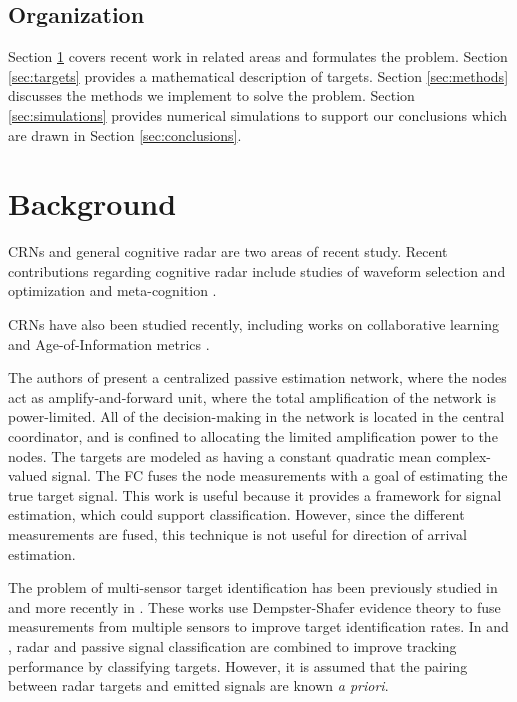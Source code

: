 \documentclass[journal,12pt,onecolumn,draftclsnofoot,]{IEEEtran}
\theoremstyle{definition}
\begin{document}
\subsection{Organization} 
Section \ref{sec:background} covers recent work in related areas and formulates the problem. 
Section \ref{sec:targets} provides a mathematical description of targets. 
Section \ref{sec:methods} discusses the methods we implement to solve the problem. 
Section \ref{sec:simulations} provides numerical simulations to support our conclusions which are drawn in Section \ref{sec:conclusions}. 




\section{Background}
\label{sec:background}
CRNs and general cognitive radar are two areas of recent study. 
Recent contributions regarding cognitive radar include  studies of waveform selection and optimization \cite{thornton2022_universaljournal} \cite{thornton2020efficient} and meta-cognition \cite{martone2017adaptable}. 

CRNs have also been studied recently, including works on collaborative learning \cite{howard2022_MMABjournal} \cite{howard2022_decentralized_conf} \cite{howard2023_hybridjournal} and Age-of-Information metrics \cite{howard2023_timelyconf}. 

The authors of \cite{6807568} present a centralized passive estimation network, where the nodes act as amplify-and-forward unit, where the total amplification of the network is power-limited. 
All of the decision-making in the network is located in the central coordinator, and is confined to allocating the limited amplification power to the nodes. 
The targets are modeled as having a constant quadratic mean complex-valued signal. 
The FC fuses the node measurements with a goal of estimating the true target signal. 
This work is useful because it provides a framework for signal estimation, which could support classification. 
However, since the different measurements are fused, this technique is not useful for direction of arrival estimation. 

The problem of multi-sensor target identification has been previously studied in \cite{Bogler1987, Hong1993} and more recently in \cite{Lei2020, Li2022}. These works use Dempster-Shafer evidence theory to fuse measurements from multiple sensors to improve target identification rates. In \cite{Challa2001} and \cite{Cao2018}, radar and passive signal classification are combined to improve tracking performance by classifying targets. However, it is assumed that the pairing between radar targets and emitted signals are known \textit{a priori}.
\end{document}

